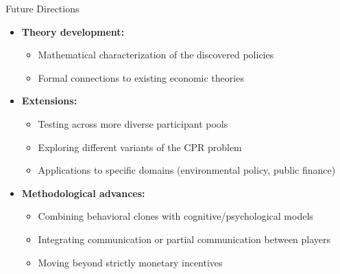 \documentclass[aspectratio=169]{beamer} %
\begin{document}
\begin{frame}{Future Directions}
\begin{itemize}
    \item \textbf{Theory development:}
    \begin{itemize}
        \item Mathematical characterization of the discovered policies
        \item Formal connections to existing economic theories
    \end{itemize}
    
    \item \textbf{Extensions:}
    \begin{itemize}
        \item Testing across more diverse participant pools
        \item Exploring different variants of the CPR problem
        \item Applications to specific domains (environmental policy, public finance)
    \end{itemize}
    
    \item \textbf{Methodological advances:}
    \begin{itemize}
        \item Combining behavioral clones with cognitive/psychological models
        \item Integrating communication or partial communication between players
        \item Moving beyond strictly monetary incentives
    \end{itemize}
\end{itemize}
\end{frame}
\end{document}
